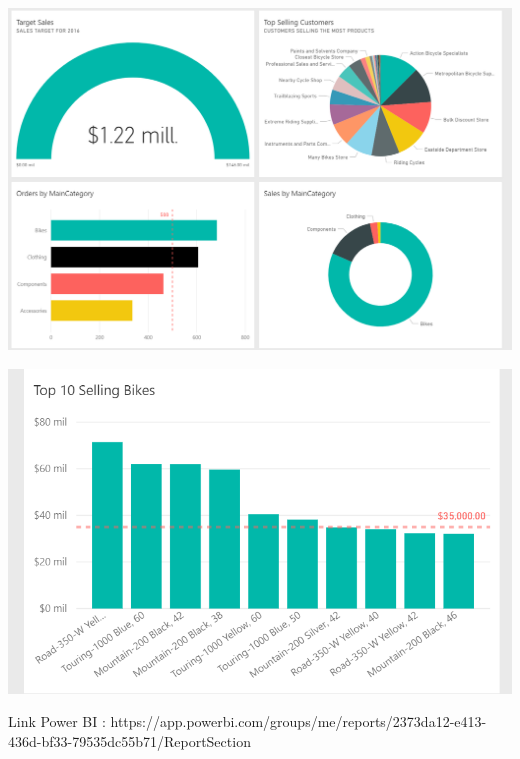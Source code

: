 \begin{itemize}
\begin{enumerate}
\begin{center}
\includegraphics[scale=0.60]{./Imagenes/ejer3_panel1.png}
\end{center}
\begin{center}
\includegraphics[scale=0.55]{./Imagenes/ejer3_panel2.png}
\end{center}

Link Power BI : https://app.powerbi.com/groups/me/reports/2373da12-e413-436d-bf33-79535dc55b71/ReportSection

\end{enumerate}

\end{itemize}







